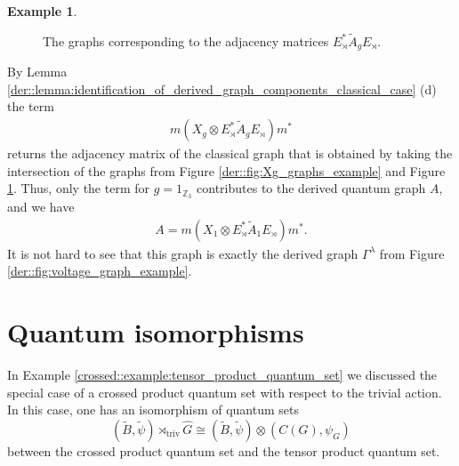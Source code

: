 \documentclass{amsart}
\newcommand{\Z}{\mathbb{Z}}
\theoremstyle{definition}
\newtheorem{example}[thm]{Example}
\theoremstyle{definition}
\begin{document}
\begin{example}
\begin{figure}[bt]
        \caption{The graphs corresponding to the adjacency matrices $E_\rtimes^\ast \tilde{A}_g E_\rtimes$.}
        \label{der::fig:EAE_graph_example}
    \end{figure}
    By Lemma \ref{der::lemma:identification_of_derived_graph_components_classical_case} (d) the term
    \begin{align*}
        m (X_g \otimes E_\rtimes^\ast \tilde{A}_g E_\rtimes) m^\ast
    \end{align*}
    returns the adjacency matrix of the classical graph that is obtained by taking the intersection of the graphs from Figure \ref{der::fig:Xg_graphs_example} and Figure \ref{der::fig:EAE_graph_example}. Thus, only the term for $g = 1_{\Z_3}$ contributes to the derived quantum graph $A$, and we have
    \begin{align*}
        A = m (X_1 \otimes E_\rtimes^\ast \tilde{A}_1 E_\rtimes) m^\ast.
    \end{align*}
    It is not hard to see that this graph is exactly the derived graph $\Gamma^\lambda$ from Figure \ref{der::fig:voltage_graph_example}.

\end{example}

\section{Quantum isomorphisms}
\label{sec::quantum_isomorphisms}

In Example \ref{crossed::example:tensor_product_quantum_set} we discussed the special case of a crossed product quantum set with respect to the trivial action. In this case, one has an isomorphism of quantum sets
$$
    (\tilde{B}, \tilde{\psi}) \rtimes_{\mathrm{triv}} \hat{G} \cong (\tilde{B}, \tilde{\psi}) \otimes (C(G), \psi_G)
$$
between the crossed product quantum set and the tensor product quantum set.
\end{document}
